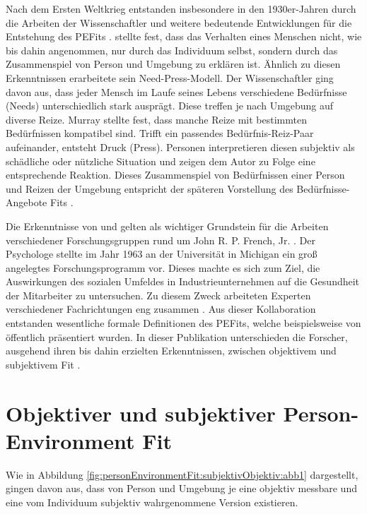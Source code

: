 Nach dem Ersten Weltkrieg entstanden insbesondere in den 1930er-Jahren durch die Arbeiten der Wissenschaftler \textcite[S. 1ff]{lewin:1936} und \textcite[S. 1ff.]{murray:1938} weitere bedeutende Entwicklungen für die Entstehung des \acp{PEFit} \cite[S. 1]{edwards:1990}. \textcite[S. 11f.]{lewin:1936} stellte fest, dass das Verhalten eines Menschen nicht, wie bis dahin angenommen, nur durch das Individuum selbst, sondern durch das Zusammenspiel von Person und Umgebung zu erklären ist. Ähnlich zu diesen Erkenntnissen erarbeitete \textcite[S. 38ff.]{murray:1938} sein Need-Press-Modell. Der Wissenschaftler ging davon aus, dass jeder Mensch im Laufe seines Lebens verschiedene Bedürfnisse (Needs) unterschiedlich stark ausprägt. Diese treffen je nach Umgebung auf diverse Reize. Murray stellte fest, dass manche Reize mit bestimmten Bedürfnissen kompatibel sind. Trifft ein passendes Bedürfnis-Reiz-Paar aufeinander, entsteht Druck (Press). Personen interpretieren diesen subjektiv als schädliche oder nützliche Situation und zeigen dem Autor zu Folge eine entsprechende Reaktion. Dieses Zusammenspiel von Bedürfnissen einer Person und Reizen der Umgebung entspricht der späteren Vorstellung des Bedürfnisse-Angebote Fits \cite[S. 8]{edwards:2008}. 

Die Erkenntnisse von \textcite[S. 1ff]{lewin:1936} und \textcite[S. 1ff.]{murray:1938} gelten als wichtiger Grundstein für die Arbeiten verschiedener Forschungsgruppen rund um John R. P. French, Jr. \cite[S. 5]{caplan:1993}. Der Psychologe stellte im Jahr 1963 an der Universität in Michigan ein groß angelegtes Forschungsprogramm vor. Dieses machte es sich zum Ziel, die Auswirkungen des sozialen Umfeldes in Industrieunternehmen auf die Gesundheit der Mitarbeiter zu untersuchen. Zu diesem Zweck arbeiteten Experten verschiedener Fachrichtungen eng zusammen \cite[S. 1ff.]{french:1963}. Aus dieser Kollaboration entstanden wesentliche formale Definitionen des \acp{PEFit}, welche beispielsweise von \textcite[S. 1ff.]{copingAndAdaption:1974} öffentlich präsentiert wurden. In dieser Publikation unterschieden die Forscher, ausgehend ihren bis dahin erzielten Erkenntnissen, zwischen objektivem und subjektivem Fit \cite[S. 4f.]{caplan:1993}\cite[S. 1ff.]{french:1966}.

\section{Objektiver und subjektiver Person-Environment Fit}
\label{ch:personEnvironmentFit:subjektivObjektiv}
Wie in Abbildung \ref{fig:personEnvironmentFit:subjektivObjektiv:abb1} dargestellt, gingen \textcite[S. 1ff.]{copingAndAdaption:1974} davon aus, dass von Person und Umgebung je eine objektiv messbare und eine vom Individuum subjektiv wahrgenommene Version existieren.

